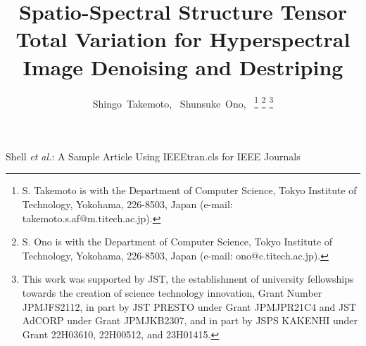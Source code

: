 \documentclass[10pt,journal]{IEEEtran}
\begin{document}
\title{Spatio-Spectral Structure Tensor Total Variation for Hyperspectral Image Denoising and Destriping}

\author{Shingo~Takemoto,~
        Shunsuke~Ono,~
\thanks{S. Takemoto is with the Department of Computer Science, Tokyo Institute of Technology, Yokohama, 226-8503, Japan (e-mail: takemoto.s.af@m.titech.ac.jp).}
\thanks{S. Ono is with the Department of Computer Science, Tokyo Institute of Technology, Yokohama, 226-8503, Japan (e-mail: ono@c.titech.ac.jp).}%
\thanks{This work was supported by JST, the establishment of university fellowships towards the creation of science technology innovation, Grant Number JPMJFS2112, in part by JST PRESTO under Grant JPMJPR21C4 and JST AdCORP under Grant JPMJKB2307, and in part by JSPS KAKENHI under Grant 22H03610, 22H00512, and 23H01415.}}


%
{Shell \MakeLowercase{\textit{et al.}}: A Sample Article Using IEEEtran.cls for IEEE Journals}


\maketitle
\end{document}
